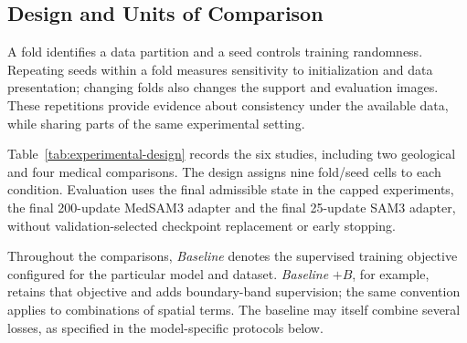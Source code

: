 \documentclass[12pt,a4paper]{article}
\begin{document}
\subsection{Design and Units of Comparison}
\label{sec:experimental-structure}

A fold identifies a data partition and a seed controls training
randomness. Repeating seeds within a fold measures sensitivity to
initialization and data presentation; changing folds also changes the
support and evaluation images. These repetitions provide evidence about
consistency under the available data, while sharing parts of the same
experimental setting.

Table~\ref{tab:experimental-design} records the six studies, including
two geological and four medical comparisons. The design assigns nine fold/seed cells
to each condition. Evaluation uses the final admissible state in the
capped experiments, the final 200-update MedSAM3 adapter and the final
25-update SAM3 adapter, without validation-selected checkpoint
replacement or early stopping.

Throughout the comparisons, \emph{Baseline} denotes the supervised
training objective configured for the particular model and dataset.
\emph{Baseline} $+B$, for example, retains that objective and adds
boundary-band supervision; the same convention applies to combinations
of spatial terms. The baseline may itself combine several losses, as
specified in the model-specific protocols below.
\end{document}
